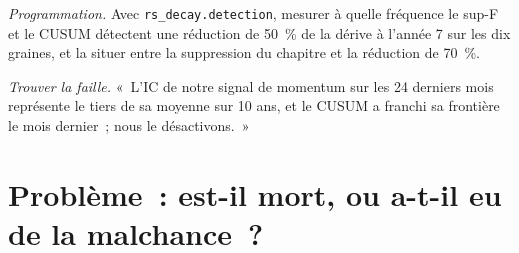 \begin{exercise}[$\star\star\star$]\label{exo:rs:half-life-decay-and-stability:7}
\emph{Programmation.} Avec \texttt{rs\_decay.detection}, mesurer à quelle fréquence le sup-F et le CUSUM détectent une réduction de 50~\% de la dérive à l'année 7 sur les
dix graines, et la situer entre la suppression du chapitre et la réduction de 70~\%.
\end{exercise}

\begin{exercise}[$\star\star\star$]\label{exo:rs:half-life-decay-and-stability:8}
\emph{Trouver la faille.} «~L'IC de notre signal de momentum sur les 24 derniers mois représente le tiers de sa moyenne sur 10 ans, et le CUSUM a franchi sa frontière le
mois dernier~; nous le désactivons.~»
\end{exercise}

\section{Problème~: est-il mort, ou a-t-il eu de la malchance~?}

